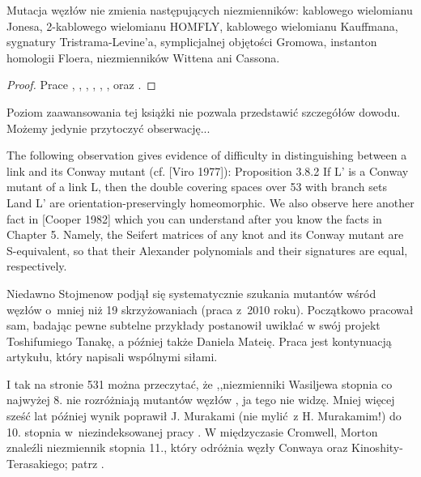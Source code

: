 \begin{proposition}
    Mutacja węzłów nie zmienia następujących niezmienników:
    kablowego wielomianu Jonesa, %
    2-kablowego wielomianu HOMFLY, %
    kablowego wielomianu Kauffmana, %
    sygnatury Tristrama-Levine'a, %
    symplicjalnej objętości Gromowa, %
    instanton homologii Floera, %
    niezmienników Wittena %
    ani Cassona. %
\end{proposition}

\begin{proof}
    Prace \cite{menasco91}, \cite{przytycki89}, \cite{lipson87}, \cite{cooper99}, \cite{ruberman87}, \cite{ruberman99}, \cite{rong94} oraz \cite{kirk89}.
\end{proof}

Poziom zaawansowania tej książki nie pozwala przedstawić szczegółów dowodu.
Możemy jedynie przytoczyć obserwację... 

\begin{tobedone}
The following observation gives evidence of difficulty in distinguishing between a link and its Conway mutant (cf. [Viro 1977]):
Proposition 3.8.2 If L' is a Conway mutant of a link L, then the double covering spaces over 53 with branch sets Land L' are orientation-preservingly homeomorphic.
We also observe here another fact in [Cooper 1982] which you can understand after you know the facts in Chapter 5. Namely, the Seifert matrices of any knot and its Conway mutant are S-equivalent, so that their Alexander polynomials and their signatures are equal, respectively.
\end{tobedone}

Niedawno Stojmenow podjął się systematycznie szukania mutantów wśród węzłów o~mniej niż 19 skrzyżowaniach (praca \cite{stoimenow10} z~2010 roku).
Początkowo pracował sam, badając pewne subtelne przykłady postanowił uwikłać w swój projekt Toshifumiego Tanakę, a później także Daniela Mateię.
Praca \cite{stoimenow10} jest kontynuacją artykułu, który napisali wspólnymi siłami.

I tak na stronie 531 można przeczytać, że ,,niezmienniki Wasiljewa stopnia co najwyżej 8. nie rozróżniają mutantów węzłów \cite{chmutov94}, ja tego nie widzę.
Mniej więcej sześć lat później wynik poprawił J. Murakami (nie mylić z H. Murakamim!) do 10. stopnia w~niezindeksowanej pracy \cite{murakami99}.
W międzyczasie Cromwell, Morton znaleźli niezmiennik stopnia 11., który odróżnia węzły Conwaya oraz Kinoshity-Terasakiego; patrz \cite{cromwell96}.

